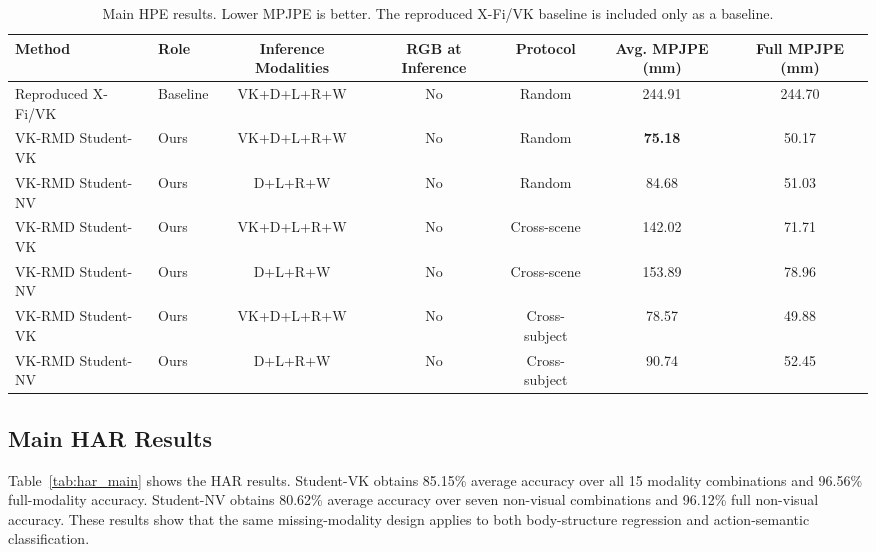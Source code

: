 \documentclass[journal]{IEEEtran}
\newcommand{\ours}{VK-RMD}
\newcommand{\mpjpe}{MPJPE}
\begin{document}
\begin{table}[t]
\centering
\caption{Main HPE results. Lower \mpjpe{} is better. The reproduced X-Fi/VK baseline is included only as a baseline.}
\label{tab:hpe_main}
\begin{tabular}{llccccc}
\toprule
Method & Role & Inference Modalities & RGB at Inference & Protocol & Avg. \mpjpe{} (mm) & Full \mpjpe{} (mm) \\
\midrule
Reproduced X-Fi/VK & Baseline & VK+D+L+R+W & No & Random & 244.91 & 244.70 \\
\ours{} Student-VK & Ours & VK+D+L+R+W & No & Random & \textbf{75.18} & 50.17 \\
\ours{} Student-NV & Ours & D+L+R+W & No & Random & 84.68 & 51.03 \\
\ours{} Student-VK & Ours & VK+D+L+R+W & No & Cross-scene & 142.02 & 71.71 \\
\ours{} Student-NV & Ours & D+L+R+W & No & Cross-scene & 153.89 & 78.96 \\
\ours{} Student-VK & Ours & VK+D+L+R+W & No & Cross-subject & 78.57 & 49.88 \\
\ours{} Student-NV & Ours & D+L+R+W & No & Cross-subject & 90.74 & 52.45 \\
\bottomrule
\end{tabular}
\end{table}

\subsection{Main HAR Results}

Table~\ref{tab:har_main} shows the HAR results. Student-VK obtains 85.15\% average accuracy over all 15 modality combinations and 96.56\% full-modality accuracy. Student-NV obtains 80.62\% average accuracy over seven non-visual combinations and 96.12\% full non-visual accuracy. These results show that the same missing-modality design applies to both body-structure regression and action-semantic classification.
\end{document}
